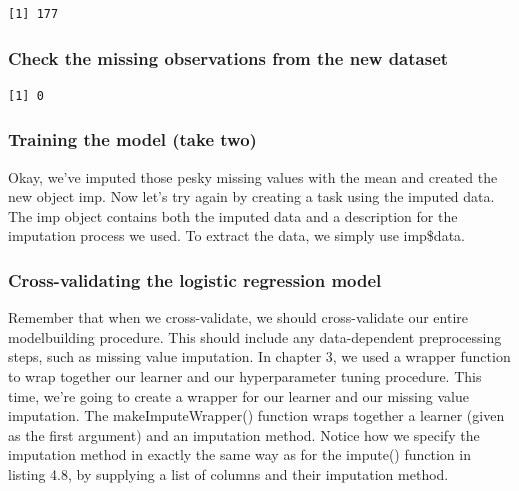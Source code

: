 \documentclass[
]{article}
\newenvironment{Shaded}{\begin{snugshade}}{\end{snugshade}}
\newcommand{\AttributeTok}[1]{\textcolor[rgb]{0.13,0.29,0.53}{#1}}
\newcommand{\FunctionTok}[1]{\textcolor[rgb]{0.13,0.29,0.53}{\textbf{#1}}}
\newcommand{\NormalTok}[1]{#1}
\newcommand{\OtherTok}[1]{\textcolor[rgb]{0.56,0.35,0.01}{#1}}
\newcommand{\SpecialCharTok}[1]{\textcolor[rgb]{0.81,0.36,0.00}{\textbf{#1}}}
\newcommand{\StringTok}[1]{\textcolor[rgb]{0.31,0.60,0.02}{#1}}
\begin{document}
\begin{verbatim}
[1] 177
\end{verbatim}

\subsubsection{Check the missing observations from the new
dataset}\label{check-the-missing-observations-from-the-new-dataset}

\begin{Shaded}
\end{Shaded}

\begin{verbatim}
[1] 0
\end{verbatim}

\subsubsection{Training the model (take
two)}\label{training-the-model-take-two}

Okay, we've imputed those pesky missing values with the mean and created
the new object imp. Now let's try again by creating a task using the
imputed data. The imp object contains both the imputed data and a
description for the imputation process we used. To extract the data, we
simply use imp\$data.

\begin{Shaded}
\end{Shaded}

\subsubsection{Cross-validating the logistic regression
model}\label{cross-validating-the-logistic-regression-model}

Remember that when we cross-validate, we should cross-validate our
entire modelbuilding procedure. This should include any data-dependent
preprocessing steps, such as missing value imputation. In chapter 3, we
used a wrapper function to wrap together our learner and our
hyperparameter tuning procedure. This time, we're going to create a
wrapper for our learner and our missing value imputation. The
makeImputeWrapper() function wraps together a learner (given as the
first argument) and an imputation method. Notice how we specify the
imputation method in exactly the same way as for the impute() function
in listing 4.8, by supplying a list of columns and their imputation
method.
\end{document}
